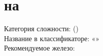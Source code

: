 
\chapter{\routeName{} на \routePeak}
  \noindent Категория сложности: \routeCategory (\routeType)\\
  \noindent Название в классификаторе: «\routeName»\\
  \noindent Рекомендуемое железо: \routeEquipment

\routeDescription
